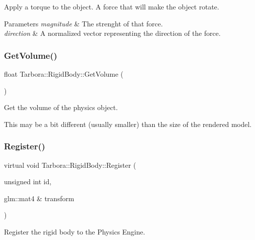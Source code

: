 Apply a torque to the object. A force that will make the object rotate. 


\begin{DoxyParams}{Parameters}
{\em magnitude} & The strenght of that force. \\
\hline
{\em direction} & A normalized vector representing the direction of the force. \\
\hline
\end{DoxyParams}
\mbox{\label{classTarbora_1_1RigidBody_a04d55e1752e8b1c31a08b460d971ec09}} 
\subsubsection{\texorpdfstring{Get\+Volume()}{GetVolume()}}
{\footnotesize\ttfamily float Tarbora\+::\+Rigid\+Body\+::\+Get\+Volume (\begin{DoxyParamCaption}{ }\end{DoxyParamCaption})\hspace{0.3cm}{\ttfamily [inline]}}



Get the volume of the physics object. 

This may be a bit different (usually smaller) than the size of the rendered model. \mbox{\label{classTarbora_1_1RigidBody_a5f41c214aabe2a7f069a317cb755f0f1}} 
\subsubsection{\texorpdfstring{Register()}{Register()}}
{\footnotesize\ttfamily virtual void Tarbora\+::\+Rigid\+Body\+::\+Register (\begin{DoxyParamCaption}\item[{unsigned int}]{id,  }\item[{glm\+::mat4 \&}]{transform }\end{DoxyParamCaption})\hspace{0.3cm}{\ttfamily [pure virtual]}}



Register the rigid body to the Physics Engine. 


